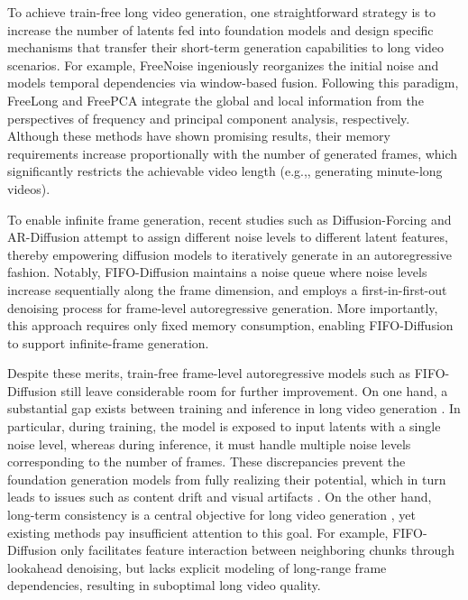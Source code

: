 \documentclass{llmxive}
\providecommand{\eg}{e.g.,\xspace}
\begin{document}
To achieve train-free long video generation, one straightforward strategy is to increase the number of latents fed into foundation models and design specific mechanisms that transfer their short-term generation capabilities to long video scenarios.
For example, FreeNoise \cite{qiu2023freenoise} ingeniously reorganizes the initial noise and models temporal dependencies via window-based fusion.
Following this paradigm, FreeLong \cite{lu2024freelong} and FreePCA \cite{tan2025freepca} integrate the global and local information from the perspectives of frequency and principal component analysis, respectively.
Although these methods have shown promising results, their memory requirements increase proportionally with the number of generated frames, which significantly restricts the achievable video length (\eg, generating minute-long videos).



To enable infinite frame generation, recent studies such as Diffusion-Forcing \cite{chen2024diffusion} and AR-Diffusion \cite{sun2025ar} attempt to assign different noise levels to different latent features, thereby empowering diffusion models to iteratively generate in an autoregressive fashion. 
Notably, FIFO-Diffusion \cite{kim2024fifo} maintains a noise queue where noise levels increase sequentially along the frame dimension, and employs a first-in-first-out denoising process for frame-level autoregressive generation. More importantly, this approach requires only fixed memory consumption, enabling FIFO-Diffusion to support infinite-frame generation.


Despite these merits, train-free frame-level autoregressive models such as FIFO-Diffusion still leave considerable room for further improvement.
On one hand, a substantial gap exists between training and inference in long video generation \cite{kim2024fifo}. 
In particular, during training, the model is exposed to input latents with a single noise level, whereas during inference, it must handle multiple noise levels corresponding to the number of frames.
These discrepancies prevent the foundation generation models from fully realizing their potential, which in turn leads to issues such as content drift and visual artifacts \cite{cai2025mixture}.
On the other hand, long-term consistency is a central objective for long video generation \cite{henschel2025streamingt2v, yang2025scalingnoise}, yet existing methods pay insufficient attention to this goal.
For example, FIFO-Diffusion only facilitates feature interaction between neighboring chunks through lookahead denoising, but lacks explicit modeling of long-range frame dependencies, resulting in suboptimal long video quality.
\end{document}
